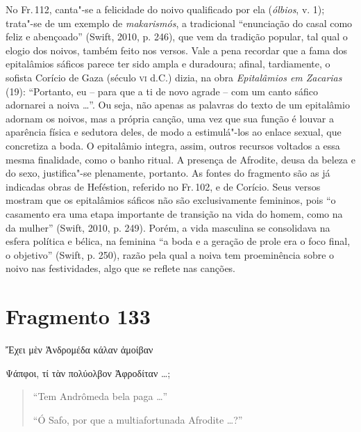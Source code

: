No Fr.\,112, canta"-se a felicidade do noivo qualificado por ela (\textit{ólbios}, v. 1); trata"-se de um exemplo de \textit{makarismós}, a tradicional “enunciação do casal como feliz e abençoado” (Swift, 2010, p. 246), que vem da tradição popular, tal qual o elogio dos noivos, também feito nos versos.
Vale a pena recordar que a fama dos epitalâmios sáficos parece ter
sido ampla e duradoura; afinal, tardiamente, o sofista Corício de Gaza (século
\textsc{vi} d.C.) dizia, na obra \textit{Epitalâmios em Zacarias} (19): ``Portanto, eu
-- para que a ti de novo agrade -- com um canto sáfico adornarei a noiva \ldots{}”.
Ou seja, não apenas as palavras do texto de um epitalâmio adornam os noivos,
mas a própria canção, uma vez que sua função é louvar a aparência física e
sedutora deles, de modo a estimulá"-los ao enlace sexual, que concretiza a
boda. O epitalâmio integra, assim, outros recursos voltados a essa mesma finalidade,
como o banho ritual. A presença de Afrodite, deusa da beleza e do sexo,
justifica"-se plenamente, portanto. As fontes do fragmento são as já indicadas
obras de Heféstion, referido no Fr.\,102, e de Corício.
Seus versos mostram que os epitalâmios sáficos não são exclusivamente femininos, pois “o casamento era uma etapa importante de transição na vida do homem, como na da mulher” (Swift, 2010, p. 249). Porém, a vida masculina se consolidava na esfera política e bélica, na feminina  “a boda e a geração de prole era o foco final, o objetivo” (Swift, p. 250), razão pela qual a noiva tem proeminência sobre o noivo nas festividades, algo que se reflete nas canções.

\pagebreak

\section{Fragmento 133}

\begin{gkverse}
Ἔχει μὲν Ἀνδρομέδα κάλαν ἀμοίβαν

\ast\quad\ast\quad\ast

Ψάπφοι, τί τὰν πολύολβον Ἀφροδίταν \ldots;
\end{gkverse}

\begin{verse}
“Tem Andrômeda bela paga \ldots{}”

\ast\quad\ast\quad\ast

“Ó Safo, por que a multiafortunada Afrodite \ldots{}?”
\end{verse}

